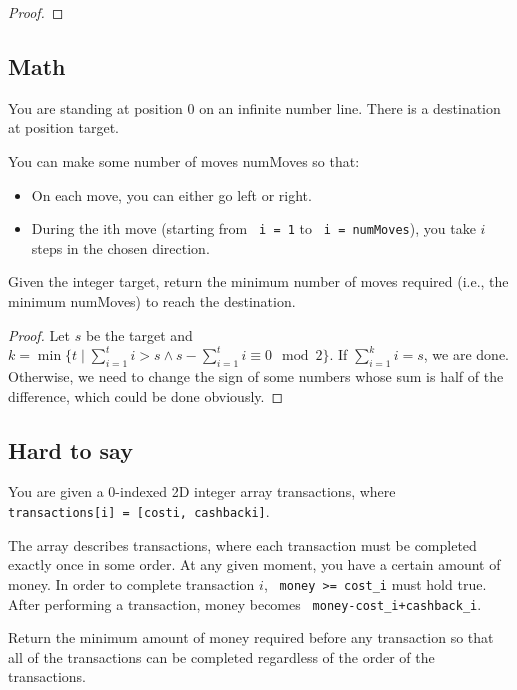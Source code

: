 \documentclass[11pt]{article}
\let\OldTexttt\texttt
\renewcommand{\texttt}[1]{\OldTexttt{\color{MidnightBlue} #1}}
\begin{document}
\begin{proof}

\end{proof}

\subsection{Math}
\label{sec:org4d4920b}
\begin{problem}
You are standing at position 0 on an infinite number line. There is a destination at position
target.

You can make some number of moves numMoves so that:
\begin{itemize}
\item On each move, you can either go left or right.
\item During the ith move (starting from \texttt{i = 1} to \texttt{i = numMoves}), you take \(i\) steps in the chosen direction.
\end{itemize}
Given the integer target, return the minimum number of moves required (i.e., the minimum
numMoves) to reach the destination.
\end{problem}

\begin{proof}
Let \(s\) be the target and  \(k=\min\{t\mid\sum_{i=1}^ti>s\wedge s-\sum_{i=1}^ti\equiv 0\mod 2\}\). If \(\sum_{i=1}^ki=s\), we are done.
Otherwise, we need to change the sign of some numbers whose sum is half of the difference, which
could be done obviously.
\end{proof}

\subsection{Hard to say}
\label{sec:org6aa89ff}
\begin{problem}
You are given a 0-indexed 2D integer array transactions, where \texttt{transactions[i] = [costi, cashbacki]}.

The array describes transactions, where each transaction must be completed exactly once in some
order. At any given moment, you have a certain amount of money. In order to complete transaction
\(i\), \texttt{money >= cost\_i} must hold true. After performing a transaction, money becomes \texttt{money-cost\_i+cashback\_i}.

Return the minimum amount of money required before any transaction so that all of the
transactions can be completed regardless of the order of the transactions.
\end{problem}
\end{document}
